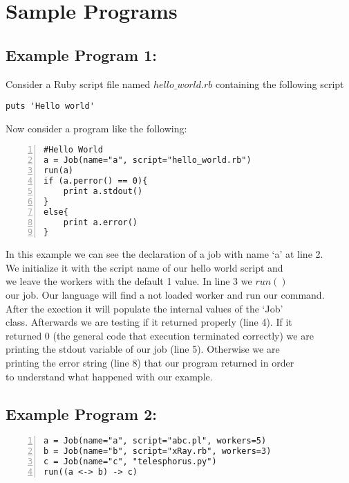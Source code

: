 \section{Sample Programs}
\label{sect:samples}
\subsection*{Example Program 1:}
Consider a Ruby script file named $hello\_world.rb$ containing the following script
\begin{verbatim}
puts 'Hello world'
\end{verbatim}
Now consider a \lang{} program like the following:
\begin{Verbatim}[numbers=left]
#Hello World
a = Job(name="a", script="hello_world.rb")
run(a)
if (a.perror() == 0){
    print a.stdout()
}
else{
    print a.error()
}
\end{Verbatim}

In this example we can see the declaration of a job with name `a' at line 2.\\
We initialize it with the script name of our hello world script and\\
we leave the workers with the default 1 value. In line 3 we $run()$\\
our job. Our language will find a not loaded worker and run our command.\\
After the exection it will populate the internal values of the `Job'\\
class. Afterwards we are testing if it returned properly (line 4). If it\\
returned 0 (the general code that execution terminated correctly) we are\\
printing the stdout variable of our job (line 5). Otherwise we are\\
printing the error string (line 8) that our program returned in order\\
to understand what happened with our example.\\

\subsection*{Example Program 2:}
\begin{Verbatim}[numbers=left]
a = Job(name="a", script="abc.pl", workers=5)
b = Job(name="b", script="xRay.rb", workers=3)
c = Job(name="c", "telesphorus.py")
run((a <-> b) -> c)
\end{Verbatim}

